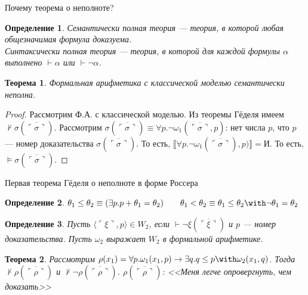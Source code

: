 \documentclass[aspectratio=169]{beamer}
\newtheorem{thm}{Теорема}[section]
\newtheorem{dfn}{Определение}[section]
\begin{document}
\begin{frame}{Почему теорема о неполноте?}
\begin{dfn}\emph{Семантически} полная теория --- теория, в которой любая общезначимая формула доказуема.\\
\emph{Синтаксически} полная теория --- теория, в которой для каждой формулы $\alpha$ выполнено $\vdash\alpha$ или $\vdash\neg\alpha$.\end{dfn}
\begin{thm}Формальная арифметика с классической моделью семантически неполна.\end{thm} \pause
\begin{proof}
 Рассмотрим Ф.А. с классической моделью. \pause
 Из теоремы Гёделя имеем $\not\vdash\sigma(\overline{\ulcorner\sigma\urcorner})$. \pause
 Рассмотрим $\sigma(\overline{\ulcorner\sigma\urcorner}) \equiv \forall p.\neg\omega_1(\overline{\ulcorner\sigma\urcorner},p)$:
нет числа $p$, что $p$ --- номер доказательства $\sigma(\overline{\ulcorner\sigma\urcorner})$. \pause 
 То есть, $\llbracket \forall p.\neg\omega_1(\overline{\ulcorner\sigma\urcorner}),p) \rrbracket = \text{И}$. \pause
 То есть, $\models \sigma(\overline{\ulcorner\sigma\urcorner})$.
\end{proof}

\end{frame}

\begin{frame}{Первая теорема Гёделя о неполноте в форме Россера}
\begin{dfn}$\theta_1\le\theta_2 \equiv (\exists p.p+\theta_1=\theta_2)\quad\quad\theta_1<\theta_2\equiv\theta_1\le\theta_2\with\neg\theta_1=\theta_2$\end{dfn}\pause
\begin{dfn}Пусть $\langle \ulcorner\xi\urcorner,p\rangle \in W_2$, если $\vdash\neg\xi(\overline{\ulcorner\xi\urcorner})$ и $p$ --- номер доказательства.
Пусть $\omega_2$ выражает $W_2$ в формальной арифметике.\end{dfn}\pause
\begin{thm}Рассмотрим $\rho(x_1) = \forall p.\omega_1(x_1,p)\rightarrow\exists q.q \le p \with \omega_2(x_1,q)$. \pause
Тогда $\not\vdash\rho(\overline{\ulcorner\rho\urcorner})$ и $\not\vdash\neg\rho(\overline{\ulcorner\rho\urcorner})$. \pause
$\rho(\overline{\ulcorner\rho\urcorner})$: <<Меня легче опровергнуть, чем доказать>>
\end{thm}%
\end{frame}
\end{document}
